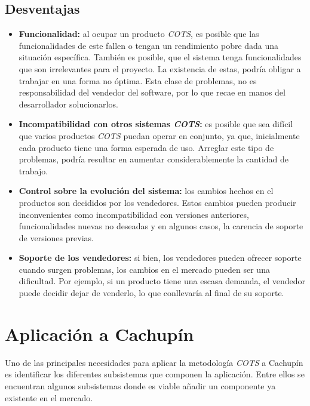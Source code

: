\documentclass{udpreport}
\begin{document}
	\section{Desventajas}
	\begin{itemize}
	\item \textbf{Funcionalidad:} al ocupar un producto \emph{COTS}, es posible que las funcionalidades de este fallen o tengan un rendimiento pobre dada una situación específica. También es posible, que el sistema tenga funcionalidades que son irrelevantes para el proyecto. La existencia de estas, podría obligar a trabajar en una forma no óptima. Esta clase de problemas, no es responsabilidad del vendedor del software, por lo que recae en manos del desarrollador solucionarlos.
	
	\item \textbf{Incompatibilidad con otros sistemas \emph{COTS}:} es posible que sea difícil que varios productos \emph{COTS} puedan operar en conjunto, ya que, inicialmente cada producto tiene una forma esperada de uso. Arreglar este tipo de problemas, podría resultar en aumentar considerablemente la cantidad de trabajo.
	
	\item \textbf{Control sobre la evolución del sistema:} los cambios hechos en el productos son decididos por los vendedores. Estos cambios pueden producir inconvenientes como incompatibilidad con versiones anteriores, funcionalidades nuevas no deseadas y en algunos casos, la carencia de soporte de versiones previas. 
	
	\item \textbf{Soporte de los vendedores:} si bien, los vendedores pueden ofrecer soporte cuando surgen problemas, los cambios en el mercado pueden ser una dificultad. Por ejemplo, si un producto tiene una escasa demanda, el vendedor puede decidir dejar de venderlo, lo que conllevaría al final de su soporte. 
	\end{itemize}

\chapter{Aplicación a Cachupín}

Uno de las principales necesidades para aplicar la metodología \emph{COTS} a Cachupín es identificar los diferentes subsistemas que componen la aplicación. Entre ellos se encuentran algunos subsistemas donde es viable añadir un componente ya existente en el mercado.
\end{document}

